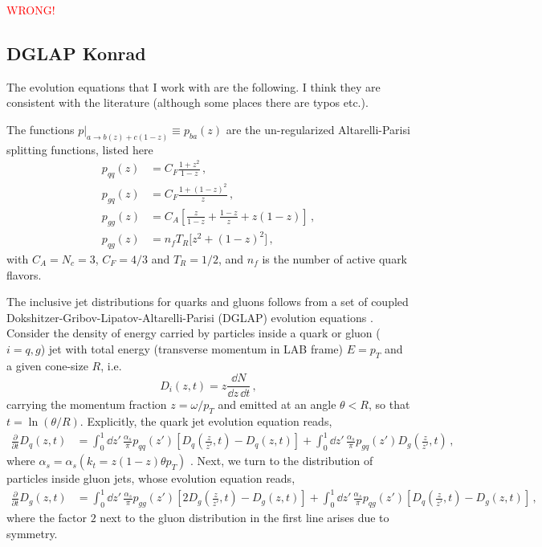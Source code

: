 \documentclass[main.tex]{subfiles}
\begin{document}
\textcolor{red}{WRONG!}


\subsection{DGLAP Konrad }

The evolution equations that I work with are the following. I think they are consistent with the literature (although some places there are typos etc.).

The functions $p|_{a\to b(z)+c(1-z)} \equiv p_{ba}(z)$ are the un-regularized Altarelli-Parisi splitting functions, listed here
\begin{align}
p_{qq}(z) &= C_F \frac{1+z^2}{1-z} \,,\\
p_{gq}(z) &= C_F \frac{1+(1-z)^2}{z} \,,\\
p_{gg}(z) &= C_A \left[\frac{z}{1-z} + \frac{1-z}{z} + z(1-z) \right]\,, \\
p_{qg}(z) &=  n_f T_R \big[ z^2 + (1-z)^2 \big] \,,
\end{align}
with $C_A = N_c =3$, $C_F = 4/3$ and $T_R =1/2$, and $n_f$ is the number of active quark flavors.

The inclusive jet distributions for quarks and gluons follows from a set of coupled Dokshitzer-Gribov-Lipatov-Altarelli-Parisi (DGLAP) evolution equations \cite{Dasgupta_2015}. Consider the density of energy carried by particles inside a quark or gluon ($i=q,g$) jet with total energy (transverse momentum in LAB frame) $E=p_T$ and a given cone-size $R$, i.e.
\begin{equation}
    D_{i}(z,t) = z\frac{\dd N}{\dd z \, \dd t}\,,
\end{equation}
carrying the momentum fraction $z = \omega/p_T$ and emitted at an angle $\theta<R$, so that $t = \ln (\theta/R)$.
Explicitly, the quark jet evolution equation reads,
\begin{align}
\label{eq:qevol-1}
\frac{\partial}{\partial t} D_{q} (z,t) & = \int_0^1 \dd z'\, \frac{\alpha_s}{\pi}p_{qq}(z')\left[ D_{q}\left( \frac{z}{z'}, t \right) - D_{q}(z,t) \right] + \int_0^1 \dd z'\, \frac{\alpha_s}{\pi}p_{gq}(z') D_{g} \left( \frac{z}{z'} ,t \right) \,,
\end{align}
where \(\alpha_s = \alpha_s(k_t=z(1-z)\theta p_T)\) . Next, we turn to the distribution of particles inside gluon jets, whose evolution equation reads,
\begin{align}
\label{eq:gevol-1}
\frac{\partial}{\partial t} D_{g}(z,t) &= \int_0^1 \dd z' \, \frac{\alpha_s}{\pi} p_{gg}(z') \left[2 D_{g} \left(\frac{z}{z'} ,t \right) - D_{g}(z,t) \right] + \int_0^1 \dd z'\,\frac{\alpha_s}{\pi} p_{qg}(z') \left[ D_{q} \left(\frac{z}{z'},t \right) - D_{g}(z,t) \right] \,,
\end{align}
where the factor \(2\) next to the gluon distribution in the first line arises due to symmetry. 
\end{document}
